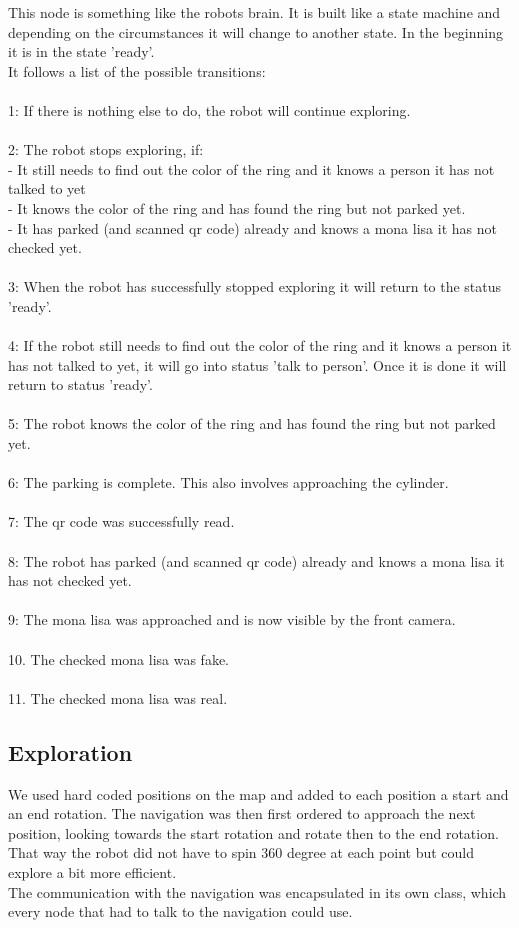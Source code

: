 \documentclass[a4paper,
  twoside, %
  headlines=2.1 %
  ]{scrartcl}
\begin{document}
This node is something like the robots brain. It is built like a state machine and depending on the circumstances it will change to another state. In the beginning it is in the state 'ready'.\\
It follows a list of the possible transitions:\\
\\
1: If there is nothing else to do, the robot will continue exploring.\\
\\
2: The robot stops exploring, if:\\
- It still needs to find out the color of the ring and it knows a person it has not talked to yet\\
- It knows the color of the ring and has found the ring but not parked yet.\\
- It has parked (and scanned qr code) already and knows a mona lisa it has not checked yet.\\
\\
3: When the robot has successfully stopped exploring it will return to the status 'ready'.\\
\\
4: If the robot still needs to find out the color of the ring and it knows a person it has not talked to yet, it will go into status 'talk to person'. Once it is done it will return to status 'ready'.\\
\\
5: The robot knows the color of the ring and has found the ring but not parked yet.\\
\\
6: The parking is complete. This also involves approaching the cylinder.\\
\\
7: The qr code was successfully read.\\
\\
8: The robot has parked (and scanned qr code) already and knows a mona lisa it has not checked yet.\\
\\
9: The mona lisa was approached and is now visible by the front camera.\\
\\
10. The checked mona lisa was fake.\\
\\
11. The checked mona lisa was real.

\subsection{Exploration}
We used hard coded positions on the map and added to each position a start and an end rotation. The navigation was then first ordered to approach the next position, looking towards the start rotation and rotate then to the end rotation. That way the robot did not have to spin 360 degree at each point but could explore a bit more efficient.\\
The communication with the navigation was encapsulated in its own class, which every node that had to talk to the navigation could use.\\
\end{document}
